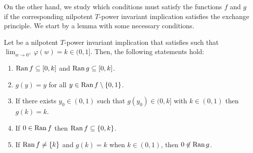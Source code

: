 On the other hand, we study which conditions must satisfy the functions $f$ and $g$ if the corresponding nilpotent $T$-power invariant implication satisfies the exchange principle. We start by a lemma with some necessary conditions.

\begin{lemma}\label{lem:nilpotent:(EP)f&g1}
	Let \IT be a nilpotent $T$-power invariant implication that satisfies \EP such that $\displaystyle \lim_{w \to 0^+} \varphi (w) = k \in (0,1]$. Then, the following statements hold:
	\begin{enumerate}[label=(\roman*)]
		\item $\operatorname{Ran} f \subseteq [0,k]$ and $\operatorname{Ran} g \subseteq [0,k]$.
		\item $g(y)=y$ for all $y \in \operatorname{Ran} f \setminus \{0,1\}$.
		\item If there exists $y_0 \in (0,1)$ such that $g(y_0) \in (0,k]$ with $k \in (0,1)$ then $g(k)=k$.
		\item If $0 \in \operatorname{Ran} f$ then $\operatorname{Ran} f \subseteq \{0,k\}$.
		\item If $\operatorname{Ran} f \not = \{k\}$ and $g(k)=k$ when $k \in (0,1)$, then $0 \not \in \operatorname{Ran} g$.
	\end{enumerate}
\end{lemma}

